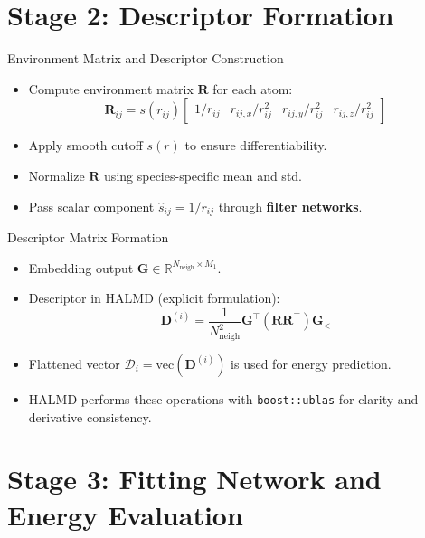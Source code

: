 \documentclass[aspectratio=169]{beamer}
\begin{document}
\section{Stage 2: Descriptor Formation}

\begin{frame}{Environment Matrix and Descriptor Construction}
\begin{itemize}
    \item Compute environment matrix $\mathbf{R}$ for each atom:
    \[
    \mathbf{R}_{ij} =
    s(r_{ij})
    \begin{bmatrix}
        1/r_{ij} & r_{ij,x}/r_{ij}^2 & r_{ij,y}/r_{ij}^2 & r_{ij,z}/r_{ij}^2
    \end{bmatrix}
    \]
    \item Apply smooth cutoff $s(r)$ to ensure differentiability.
    \item Normalize $\mathbf{R}$ using species-specific mean and std.
    \item Pass scalar component $\hat{s}_{ij} = 1/r_{ij}$ through \textbf{filter networks}.
\end{itemize}
\end{frame}

\begin{frame}{Descriptor Matrix Formation}
\begin{itemize}
    \item Embedding output $\mathbf{G} \in \mathbb{R}^{N_{\text{neigh}} \times M_1}$.
    \item Descriptor in HALMD (explicit formulation):
    \[
    \mathbf{D}^{(i)} = \frac{1}{N_{\text{neigh}}^2}
    \mathbf{G}^{\top} (\mathbf{R}\mathbf{R}^{\top}) \mathbf{G}_{<}
    \]
    \item Flattened vector $\mathcal{D}_i = \mathrm{vec}(\mathbf{D}^{(i)})$ is used for energy prediction.
    \item HALMD performs these operations with \texttt{boost::ublas} for clarity and derivative consistency.
\end{itemize}
\end{frame}

\section{Stage 3: Fitting Network and Energy Evaluation}
\end{document}

